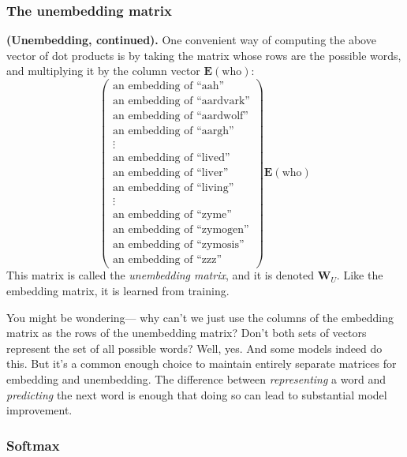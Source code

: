\documentclass{article}
\begin{document}
\subsubsection*{The unembedding matrix}

\textbf{(Unembedding, continued).} One convenient way of computing the above vector of dot products is by taking the matrix whose rows are the possible words, and multiplying it by the column vector $\mathbf{E}(\text{who})$:
$$
\begin{pmatrix}
	\text{an embedding of ``aah''} \\
	\text{an embedding of ``aardvark''} \\
	\text{an embedding of ``aardwolf''} \\
	\text{an embedding of ``aargh''} \\
	\vdots \\
	\text{an embedding of ``lived''} \\
	\text{an embedding of ``liver''} \\
	\text{an embedding of ``living''} \\
	\vdots \\
	\text{an embedding of ``zyme''} \\
	\text{an embedding of ``zymogen''} \\
	\text{an embedding of ``zymosis''} \\
	\text{an embedding of ``zzz''}
\end{pmatrix}
\mathbf{E}(\text{who})
$$
This matrix is called the \textit{unembedding matrix}, and it is denoted $\mathbf{W}_U$. Like the embedding matrix, it is learned from training.

You might be wondering--- why can't we just use the columns of the embedding matrix as the rows of the unembedding matrix? Don't both sets of vectors represent the set of all possible words? Well, yes. And some models indeed do this. But it's a common enough choice to maintain entirely separate matrices for embedding and unembedding. The difference between \textit{representing} a word and \textit{predicting} the next word is enough that doing so can lead to substantial model improvement.

\subsubsection*{Softmax}
\end{document}
